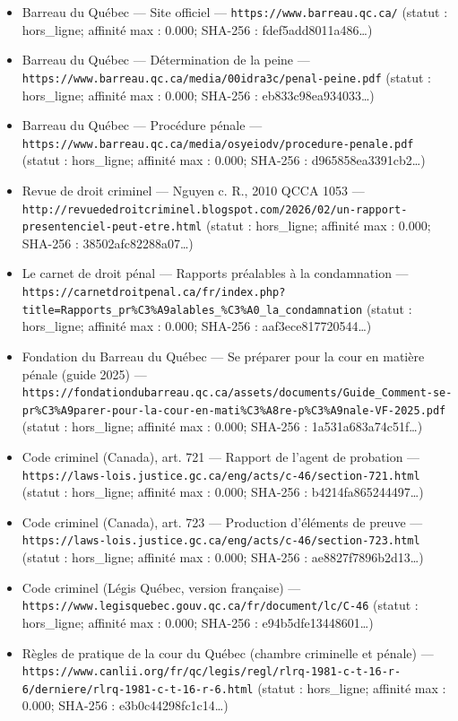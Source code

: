 \documentclass[12pt,a4paper]{article}
\begin{document}
\begin{itemize}[leftmargin=*]
\item Barreau du Québec — Site officiel — \texttt{https://www.barreau.qc.ca/} (statut : hors\_ligne; affinité max : 0.000; SHA-256 : fdef5add8011a486…)
\item Barreau du Québec — Détermination de la peine — \texttt{https://www.barreau.qc.ca/media/00idra3c/penal-peine.pdf} (statut : hors\_ligne; affinité max : 0.000; SHA-256 : eb833c98ea934033…)
\item Barreau du Québec — Procédure pénale — \texttt{https://www.barreau.qc.ca/media/osyeiodv/procedure-penale.pdf} (statut : hors\_ligne; affinité max : 0.000; SHA-256 : d965858ea3391cb2…)
\item Revue de droit criminel — Nguyen c. R., 2010 QCCA 1053 — \texttt{http://revuededroitcriminel.blogspot.com/2026/02/un-rapport-presentenciel-peut-etre.html} (statut : hors\_ligne; affinité max : 0.000; SHA-256 : 38502afc82288a07…)
\item Le carnet de droit pénal — Rapports préalables à la condamnation — \texttt{https://carnetdroitpenal.ca/fr/index.php?title=Rapports\_pr\%C3\%A9alables\_\%C3\%A0\_la\_condamnation} (statut : hors\_ligne; affinité max : 0.000; SHA-256 : aaf3ece817720544…)
\item Fondation du Barreau du Québec — Se préparer pour la cour en matière pénale (guide 2025) — \texttt{https://fondationdubarreau.qc.ca/assets/documents/Guide\_Comment-se-pr\%C3\%A9parer-pour-la-cour-en-mati\%C3\%A8re-p\%C3\%A9nale-VF-2025.pdf} (statut : hors\_ligne; affinité max : 0.000; SHA-256 : 1a531a683a74c51f…)
\item Code criminel (Canada), art. 721 — Rapport de l'agent de probation — \texttt{https://laws-lois.justice.gc.ca/eng/acts/c-46/section-721.html} (statut : hors\_ligne; affinité max : 0.000; SHA-256 : b4214fa865244497…)
\item Code criminel (Canada), art. 723 — Production d'éléments de preuve — \texttt{https://laws-lois.justice.gc.ca/eng/acts/c-46/section-723.html} (statut : hors\_ligne; affinité max : 0.000; SHA-256 : ae8827f7896b2d13…)
\item Code criminel (Légis Québec, version française) — \texttt{https://www.legisquebec.gouv.qc.ca/fr/document/lc/C-46} (statut : hors\_ligne; affinité max : 0.000; SHA-256 : e94b5dfe13448601…)
\item Règles de pratique de la cour du Québec (chambre criminelle et pénale) — \texttt{https://www.canlii.org/fr/qc/legis/regl/rlrq-1981-c-t-16-r-6/derniere/rlrq-1981-c-t-16-r-6.html} (statut : hors\_ligne; affinité max : 0.000; SHA-256 : e3b0c44298fc1c14…)
\end{itemize}
\end{document}
